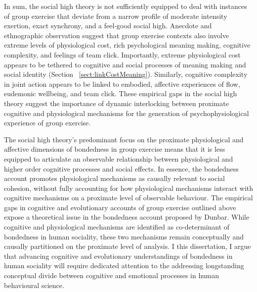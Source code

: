\begin{CJK}{UTF8}{gbsn}
In sum, the social high theory is not sufficiently equipped to deal with instances of group exercise that deviate from a narrow profile of moderate intensity exertion, exact synchrony, and a feel-good social high.  Anecdote and ethnographic observation suggest that group exercise contexts also involve extreme levels of physiological cost, rich psychological meaning making, cognitive complexity, and feelings of team click.  Importantly, extreme physiological cost appears to be tethered to cognitive and social processes of meaning making and social identity (Section ~\ref{sect:linkCostMeaning}).  Similarly, cognitive complexity in joint action appears to be linked to embodied, affective experiences of flow, eudemonic wellbeing, and team click.  These empirical gaps in the social high theory suggest the importance of dynamic interlocking between proximate cognitive and physiological mechanisms for the generation of psychophysiological experience of group exercise.

The social high theory's predominant focus on the proximate physiological and affective dimensions of bondedness in group exercise means that it is less equipped to articulate an observable relationship between physiological and higher order cognitive processes and social effects.  In essence, the bondedness account promotes physiological mechanisms as causally relevant to social cohesion, without fully accounting for how physiological mechanisms interact with cognitive mechanisms on a proximate level of observable behaviour.  The empirical gaps in cognitive and evolutionary accounts of group exercise outlined above expose a theoretical issue in the bondedness account proposed by Dunbar. While cognitive and physiological mechanisms are identified as co-determinant of bondedness in human sociality, these two mechanisms remain  conceptually and causally partitioned on the proximate level of analysis.   I this dissertation, I argue that advancing cognitive and evolutionary understandings of bondedness in human sociality will require dedicated attention to the addressing longstanding conceptual divide between cognitive and emotional processes in human behavioural science.




\end{CJK}
